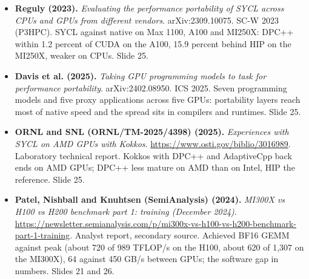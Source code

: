 \documentclass[11pt,letterpaper]{article}
\begin{document}
\begin{itemize}[leftmargin=1.2em,itemsep=3pt]
\item \textbf{Reguly (2023).} \textit{Evaluating the performance portability of SYCL across CPUs and GPUs from different vendors}. arXiv:2309.10075. SC-W 2023 (P3HPC). SYCL against native on Max 1100, A100 and MI250X: DPC++ within 1.2 percent of CUDA on the A100, 15.9 percent behind HIP on the MI250X, weaker on CPUs. Slide 25.
\item \textbf{Davis et al. (2025).} \textit{Taking GPU programming models to task for performance portability}. arXiv:2402.08950. ICS 2025. Seven programming models and five proxy applications across five GPUs: portability layers reach most of native speed and the spread sits in compilers and runtimes. Slide 25.
\item \textbf{ORNL and SNL (ORNL/TM-2025/4398) (2025).} \textit{Experiences with SYCL on AMD GPUs with Kokkos}. \url{https://www.osti.gov/biblio/3016989}. Laboratory technical report. Kokkos with DPC++ and AdaptiveCpp back ends on AMD GPUs; DPC++ less mature on AMD than on Intel, HIP the reference. Slide 25.
\item \textbf{Patel, Nishball and Knuhtsen (SemiAnalysis) (2024).} \textit{MI300X vs H100 vs H200 benchmark part 1: training (December 2024)}. \url{https://newsletter.semianalysis.com/p/mi300x-vs-h100-vs-h200-benchmark-part-1-training}. Analyst report, secondary source. Achieved BF16 GEMM against peak (about 720 of 989 TFLOP/s on the H100, about 620 of 1,307 on the MI300X), 64 against 450 GB/s between GPUs; the software gap in numbers. Slides 21 and 26.
\end{itemize}
\end{document}
